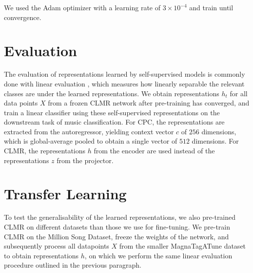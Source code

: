 We used the Adam optimizer \cite{adam_optimizer} with a learning rate of $3\times10^{-4}$ and train until convergence.


\section{Evaluation}
\label{evaluation}
The evaluation of representations learned by self-supervised models is commonly done with linear evaluation \cite{oord_representation_2019,hjelm_learning_2019,chen_simple_2020}, which measures how linearly separable the relevant classes are under the learned representations.
We obtain representations $h_t$ for all data points $X$ from a frozen CLMR network after pre-training has converged, and train a linear classifier using these self-supervised representations on the downstream task of music classification.
For CPC, the representations are extracted from the autoregressor, yielding context vector $c$ of $256$ dimensions, which is global-average pooled to obtain a single vector of $512$ dimensions.
For CLMR, the representations $h$ from the encoder are used instead of the representations $z$ from the projector.


\section{Transfer Learning}
To test the generalisability of the learned representations, we also pre-trained CLMR on different datasets than those we use for fine-tuning.
We pre-train CLMR on the Million Song Dataset, freeze the weights of the network, and subsequently process all datapoints $X$ from the smaller MagnaTagATune dataset to obtain representations $h$, on which we perform the same linear evaluation procedure outlined in the previous paragraph.

